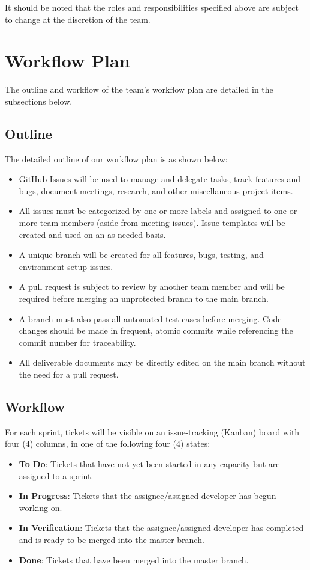 \documentclass{article}
\begin{document}
\noindent It should be noted that the roles and responsibilities specified above are subject to change at the discretion of the team.

\section{Workflow Plan}

The outline and workflow of the team's workflow plan are detailed in the subsections below.

\subsection{Outline}

The detailed outline of our workflow plan is as shown below:

\begin{itemize}
\item GitHub Issues will be used to manage and delegate tasks, track features and bugs, document meetings, research, and other miscellaneous project items.
\item All issues must be categorized by one or more labels and assigned to one or more team members (aside from meeting issues). Issue templates will be created and used on an as-needed basis.
\item A unique branch will be created for all features, bugs, testing, and environment setup issues.
\item A pull request is subject to review by another team member and will be required before merging an unprotected branch to the main branch.
\item A branch must also pass all automated test cases before merging. Code changes should be made in frequent, atomic commits while referencing the commit number for traceability.
\item All deliverable documents may be directly edited on the main branch without the need for a pull request.
\end{itemize}

\subsection{Workflow}

For each sprint, tickets will be visible on an issue-tracking (Kanban) board with four (4) columns, in one of the following four (4) states:
\begin{itemize}
\item \textbf{To Do}: Tickets that have not yet been started in any capacity but are assigned to a sprint.
\item \textbf{In Progress}: Tickets that the assignee/assigned developer has begun working on.
\item \textbf{In Verification}: Tickets that the assignee/assigned developer has completed and is ready to be merged into the master branch.
\item \textbf{Done}: Tickets that have been merged into the master branch. \\
\end{itemize}
\end{document}
